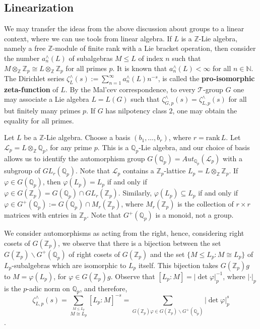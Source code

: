 \documentclass[12pt]{article}
\begin{document}
\subsection{Linearization}
We may transfer the ideas from the above discussion about groups to a linear context, where we can use tools from linear algebra.
If $L$ is a $\mathbb{Z}$-Lie algebra, namely a free $\mathbb{Z}$-module of finite rank with a Lie bracket operation, then consider the number $a_{n}^{\wedge}(L)$ of subalgebras $M\leq L$ of index $n$ such that $M\otimes_{\mathbb{Z}}\mathbb{Z}_p\cong L\otimes_{\mathbb{Z}}\mathbb{Z}_p$ for all primes $p$. It is known that $a_{n}^{\wedge}(L)<\infty$ for all $n\in\mathbb{N}$. The Dirichlet series $\zeta_{L}^{\wedge}(s):=\sum_{n=1}^{\infty}{a_{n}^{\wedge}}(L)n^{-s}$, is called the \textbf{pro-isomorphic zeta-function} of $L$. By the Mal'cev correspondence, to every $\mathcal{T}$-group $G$ one may associate a Lie algebra $L=L(G)$ such that $\zeta_{G,p}^{\wedge}(s)=\zeta_{L,p}^{\wedge}(s)$ for all but finitely many primes $p$. If $G$ has nilpotency class $2$, one may obtain the equality for all primes.\par
Let $L$ be a $\mathbb{Z}$-Lie algebra. Choose a basis $(b_1,\dots,b_r)$, where $r=\mathrm{rank}\,L$. Let $\mathcal{L}_{p}=L\otimes_{\mathbb{Z}}\mathbb{Q}_p$, for any prime $p$. This is a $\mathbb{Q}_p$-Lie algebra, and our choice of basis allows us to identify the automorphism group $G(\mathbb{Q}_p)=Aut_{\mathbb{Q}_p}(\mathcal{L}_{p})$ with a subgroup of $GL_r(\mathbb{Q}_p)$. Note that $\mathcal{L}_{p}$ contains a $\mathbb{Z}_p$-lattice $L_{p}=L\otimes_{\mathbb{Z}}\mathbb{Z}_p$. If $\varphi\in G(\mathbb{Q}_p)$, then $\varphi(L_{p})=L_{p}$ if and only if $\varphi\in G(\mathbb{Z}_p)=G(\mathbb{Q}_p)\cap GL_r(\mathbb{Z}_p)$. Similarly, $\varphi(L_{p})\subseteq L_{p}$ if and only if $\varphi\in G^{+}(\mathbb{Q}_p):=G(\mathbb{Q}_p)\cap {M}_r(\mathbb{Z}_p)$, where ${M}_r(\mathbb{Z}_p)$ is the collection of $r\times r$ matrices with entries in $\mathbb{Z}_p$. Note that $G^{+}(\mathbb{Q}_p)$ is a monoid, not a group.\par
We consider automorphisms as acting from the right, hence, considering right cosets of $G(\mathbb{Z}_p)$, we observe that there is a bijection between the set $G(\mathbb{Z}_p)\backslash G^{+}(\mathbb{Q}_p)$ of right cosets of $G(\mathbb{Z}_p)$ and the set $\{M\leq L_{p} : M\cong L_{p}\}$ of $L_{p}$-subalgebras which are isomorphic to $L_{p}$ itself. This bijection takes $G(\mathbb{Z}_p)g$ to $M=\varphi(L_{p})$, for $\varphi\in G(\mathbb{Z}_p)g$.
Observe that $[L_{p}:M]=|\det\varphi|_p^{-1}$, where $|\cdot|_p$ is the $p$-adic norm on $\mathbb{Q}_{p}$, and therefore,
\begin{equation}
\label{equation.proisomorphic.zeta}
\zeta_{L,p}^{\wedge}(s)=\underset{\overset{\scriptscriptstyle M\leq L_{p}}{\scriptscriptstyle M\cong L_{p}}}{\sum}[L_{p}:M]^{-s}=\underset{\scriptscriptstyle G(\mathbb{Z}_p)\varphi\in G(\mathbb{Z}_p)\backslash G^{+}(\mathbb{Q}_p)}{\sum}|\det\varphi|_p^s
\end{equation}.
\end{document}
